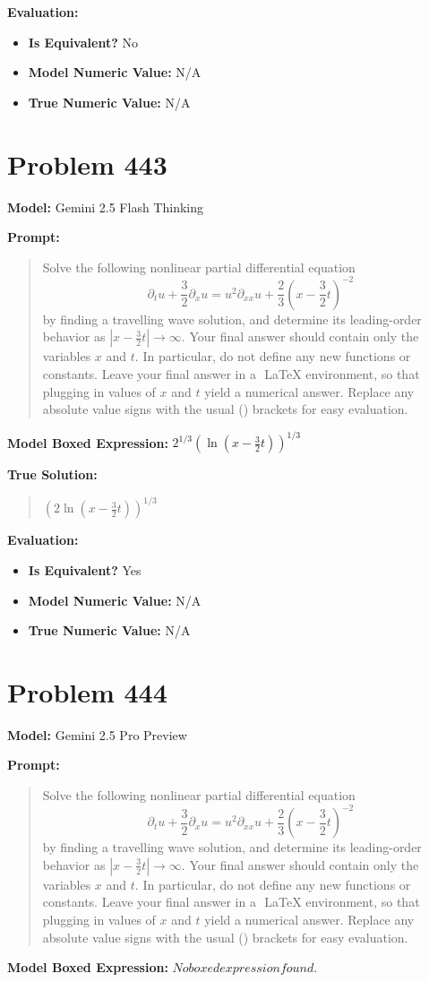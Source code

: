\documentclass{article}
\begin{document}
\textbf{Evaluation:}
\begin{itemize}
\item \textbf{Is Equivalent?} No
\item \textbf{Model Numeric Value:} N/A
\item \textbf{True Numeric Value:} N/A
\end{itemize}
\vspace{1cm}
\section*{Problem 443}
\textbf{Model:} Gemini 2.5 Flash Thinking

\textbf{Prompt:}
\begin{quote}
Solve the following nonlinear partial differential equation $$\partial_t u + \frac{3}{2} \partial_x u = u^2 \partial_{xx}u + \frac{2}{3}\left(x-\frac{3}{2}t\right)^{-2}$$ by finding a travelling wave solution, and determine its leading-order behavior as $|x-\frac{3}{2}t| \to \infty$. Your final answer should contain only the variables $x$ and $t$. In particular, do not define any new functions or constants. Leave your final answer in a $\boxed{}$ LaTeX environment, so that plugging in values of $x$ and $t$ yield a numerical answer. Replace any absolute value signs with the usual () brackets for easy evaluation.
\end{quote}
\textbf{Model Boxed Expression:} $2^{1/3}(\ln(x-\frac{3}{2}t))^{1/3}$

\textbf{True Solution:}
\begin{quote}
$\left(2\ln\left(x-\frac{3}{2}t\right)\right)^{1/3}$
\end{quote}

\textbf{Evaluation:}
\begin{itemize}
\item \textbf{Is Equivalent?} Yes
\item \textbf{Model Numeric Value:} N/A
\item \textbf{True Numeric Value:} N/A
\end{itemize}
\vspace{1cm}
\section*{Problem 444}
\textbf{Model:} Gemini 2.5 Pro Preview

\textbf{Prompt:}
\begin{quote}
Solve the following nonlinear partial differential equation $$\partial_t u + \frac{3}{2} \partial_x u = u^2 \partial_{xx}u + \frac{2}{3}\left(x-\frac{3}{2}t\right)^{-2}$$ by finding a travelling wave solution, and determine its leading-order behavior as $|x-\frac{3}{2}t| \to \infty$. Your final answer should contain only the variables $x$ and $t$. In particular, do not define any new functions or constants. Leave your final answer in a $\boxed{}$ LaTeX environment, so that plugging in values of $x$ and $t$ yield a numerical answer. Replace any absolute value signs with the usual () brackets for easy evaluation.
\end{quote}
\textbf{Model Boxed Expression:} $No boxed expression found.$
\end{document}
